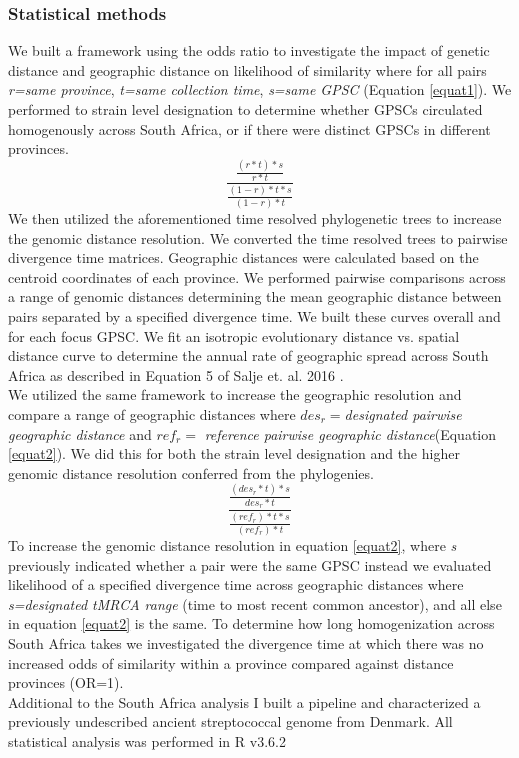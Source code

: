 \documentclass{article}
\begin{document}
\subsubsection{Statistical methods}
We built a framework using the odds ratio to investigate the impact of genetic distance and geographic distance on likelihood of similarity where for all pairs \textit{r=same province}, \textit{t=same collection time}, \textit{s=same GPSC} (Equation \ref{equat1}). We performed to strain level designation to determine whether GPSCs circulated homogenously across South Africa, or if there were distinct GPSCs in different provinces. 
\begin{equation}
\frac{\frac{(r*t)*s}{r*t}}{\frac{(1-r)*t*s}{(1-r)*t}}
\label{equat1}
\end{equation}
We then utilized the aforementioned time resolved phylogenetic trees to increase the genomic distance resolution. We converted the time resolved trees to pairwise divergence time matrices. Geographic distances were calculated based on the centroid coordinates of each province. We performed pairwise comparisons across a range of genomic distances determining the mean geographic distance between pairs separated by a specified divergence time. We built these curves overall and for each focus GPSC. We fit an isotropic evolutionary distance vs. spatial distance curve to determine the annual rate of geographic spread across South Africa as described in Equation 5 of Salje et. al. 2016 \cite{saljeEstimatingInfectiousDisease2016}. \\We utilized the same framework to increase the geographic resolution and compare a range of geographic distances where $des_r=$\textit{designated pairwise geographic distance} and  $ref_r=$ \textit{reference pairwise geographic distance}(Equation \ref{equat2}). We did this for both the strain level designation and the higher genomic distance resolution conferred from the phylogenies.
\begin{equation}
\frac{\frac{(des_r*t)*s}{des_r*t}}{\frac{(ref_r)*t*s}{(ref_r)*t}} 
\label{equat2}
\end{equation}
To increase the genomic distance resolution in equation \ref{equat2}, where \textit{s} previously indicated whether a pair were the same GPSC instead we evaluated likelihood of a specified divergence time across geographic distances where \textit{s=designated tMRCA range} (time to most recent common ancestor), and all else in equation \ref{equat2} is the same. To determine how long homogenization across South Africa takes we investigated the divergence time at which there was no increased odds of similarity within a province compared against distance provinces (OR=1). \\
Additional to the South Africa analysis I built a pipeline and characterized a previously undescribed ancient streptococcal genome from Denmark. 
All statistical analysis was performed in R v3.6.2
\end{document}
